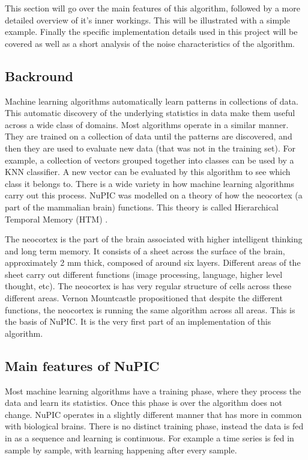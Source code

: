 \documentclass[a4paper]{jpconf}
\begin{document}
	This section will go over the main features of this algorithm, followed by a more detailed overview of it's inner workings. This will be illustrated with a simple example. Finally the specific implementation details used in this project will be covered as well as a short analysis of the noise characteristics of the algorithm.

	\subsection{Backround}
		Machine learning algorithms automatically learn patterns in collections of data. This automatic discovery of the underlying statistics in data make them useful across a wide class of domains. Most algorithms operate in a similar manner. They are trained on a collection of data until the patterns are discovered, and then they are used to evaluate new data (that was not in the training set). For example, a collection of vectors grouped together into classes can be used by a KNN classifier. A new vector can be evaluated by this algorithm to see which class it belongs to. There is a wide variety in how machine learning algorithms carry out this process. NuPIC was modelled on a theory of how the neocortex (a part of the mammalian brain) functions. This theory is called Hierarchical Temporal Memory (HTM) \cite{hawkins_intelligence_2005}.
		
		The neocortex is the part of the brain associated with higher intelligent thinking and long term memory. It consists of a sheet across the surface of the brain, approximately 2 mm thick, composed of around six layers. Different areas of the sheet carry out different functions (image processing, language, higher level thought, etc). The neocortex is has very regular structure of cells across these different areas. Vernon Mountcastle propositioned that despite the different functions, the neocortex is running the same algorithm across all areas. This is the basis of NuPIC. It is the very first part of an implementation of this algorithm.
	
	\subsection{Main features of NuPIC}
		Most machine learning algorithms have a training phase, where they process the data and learn its statistics. Once this phase is over the algorithm does not change. NuPIC operates in a slightly different manner that has more in common with biological brains. There is no distinct training phase, instead the data is fed in as a sequence and learning is continuous. For example a time series is fed in sample by sample, with learning happening after every sample.
		
\end{document}
